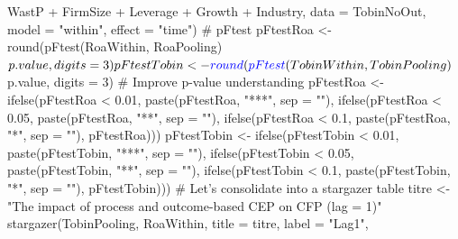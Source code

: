 \documentclass[12pt,]{article}
\newenvironment{Shaded}{}{}
\newcommand{\KeywordTok}[1]{\textcolor[rgb]{0.00,0.00,1.00}{#1}}
\newcommand{\DataTypeTok}[1]{#1}
\newcommand{\DecValTok}[1]{#1}
\newcommand{\FloatTok}[1]{#1}
\newcommand{\StringTok}[1]{\textcolor[rgb]{0.00,0.50,0.50}{#1}}
\newcommand{\CommentTok}[1]{\textcolor[rgb]{0.00,0.50,0.00}{#1}}
\newcommand{\OperatorTok}[1]{#1}
\newcommand{\NormalTok}[1]{#1}
\begin{document}
\begin{Shaded}
\begin{Highlighting}[]
{{{{\StringTok{    }\NormalTok{WastP }\OperatorTok{+}\StringTok{ }\NormalTok{FirmSize }\OperatorTok{+}\StringTok{ }\NormalTok{Leverage }\OperatorTok{+}\StringTok{ }\NormalTok{Growth }\OperatorTok{+}\StringTok{ }\NormalTok{Industry, }\DataTypeTok{data =}\NormalTok{ TobinNoOut, }
    \DataTypeTok{model =} \StringTok{"within"}\NormalTok{, }\DataTypeTok{effect =} \StringTok{"time"}\NormalTok{)}
\CommentTok{# pFtest}
\NormalTok{pFtestRoa <-}\StringTok{ }\KeywordTok{round}\NormalTok{(}\KeywordTok{pFtest}\NormalTok{(RoaWithin, RoaPooling)}\OperatorTok{$}\NormalTok{p.value, }
    \DataTypeTok{digits =} \DecValTok{3}\NormalTok{)}
\NormalTok{pFtestTobin <-}\StringTok{ }\KeywordTok{round}\NormalTok{(}\KeywordTok{pFtest}\NormalTok{(TobinWithin, TobinPooling)}\OperatorTok{$}\NormalTok{p.value, }
    \DataTypeTok{digits =} \DecValTok{3}\NormalTok{)}
\CommentTok{# Improve p-value understanding}
\NormalTok{pFtestRoa <-}\StringTok{ }\KeywordTok{ifelse}\NormalTok{(pFtestRoa }\OperatorTok{<}\StringTok{ }\FloatTok{0.01}\NormalTok{, }\KeywordTok{paste}\NormalTok{(pFtestRoa, }\StringTok{"***"}\NormalTok{, }
    \DataTypeTok{sep =} \StringTok{""}\NormalTok{), }\KeywordTok{ifelse}\NormalTok{(pFtestRoa }\OperatorTok{<}\StringTok{ }\FloatTok{0.05}\NormalTok{, }\KeywordTok{paste}\NormalTok{(pFtestRoa, }
    \StringTok{"**"}\NormalTok{, }\DataTypeTok{sep =} \StringTok{""}\NormalTok{), }\KeywordTok{ifelse}\NormalTok{(pFtestRoa }\OperatorTok{<}\StringTok{ }\FloatTok{0.1}\NormalTok{, }\KeywordTok{paste}\NormalTok{(pFtestRoa, }
    \StringTok{"*"}\NormalTok{, }\DataTypeTok{sep =} \StringTok{""}\NormalTok{), pFtestRoa)))}
\NormalTok{pFtestTobin <-}\StringTok{ }\KeywordTok{ifelse}\NormalTok{(pFtestTobin }\OperatorTok{<}\StringTok{ }\FloatTok{0.01}\NormalTok{, }\KeywordTok{paste}\NormalTok{(pFtestTobin, }
    \StringTok{"***"}\NormalTok{, }\DataTypeTok{sep =} \StringTok{""}\NormalTok{), }\KeywordTok{ifelse}\NormalTok{(pFtestTobin }\OperatorTok{<}\StringTok{ }\FloatTok{0.05}\NormalTok{, }\KeywordTok{paste}\NormalTok{(pFtestTobin, }
    \StringTok{"**"}\NormalTok{, }\DataTypeTok{sep =} \StringTok{""}\NormalTok{), }\KeywordTok{ifelse}\NormalTok{(pFtestTobin }\OperatorTok{<}\StringTok{ }\FloatTok{0.1}\NormalTok{, }\KeywordTok{paste}\NormalTok{(pFtestTobin, }
    \StringTok{"*"}\NormalTok{, }\DataTypeTok{sep =} \StringTok{""}\NormalTok{), pFtestTobin)))}
\CommentTok{# Let's consolidate into a stargazer table}
\NormalTok{titre <-}\StringTok{ "The impact of process and outcome-based CEP on CFP (lag = 1)"}
\KeywordTok{stargazer}\NormalTok{(TobinPooling, RoaWithin, }\DataTypeTok{title =}\NormalTok{ titre, }\DataTypeTok{label =} \StringTok{"Lag1"}\NormalTok{, }
}}}}
\end{Highlighting}
\end{Shaded}
\end{document}
